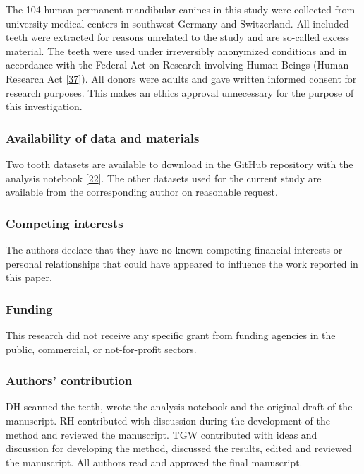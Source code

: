 \documentclass[
  american,
]{article}
\begin{document}
The 104 human permanent mandibular canines in this study were collected from university medical centers in southwest Germany and Switzerland.
All included teeth were extracted for reasons unrelated to the study and are so-called excess material.
The teeth were used under irreversibly anonymized conditions and in accordance with the Federal Act on Research involving Human Beings (Human Research Act {[}\protect\hyperlink{ref-10OKzEtEb}{37}{]}).
All donors were adults and gave written informed consent for research purposes.
This makes an ethics approval unnecessary for the purpose of this investigation.

\hypertarget{availability-of-data-and-materials}{%
\subsubsection{Availability of data and materials}\label{availability-of-data-and-materials}}

Two tooth datasets are available to download in the GitHub repository with the analysis notebook {[}\protect\hyperlink{ref-tZRGGuMm}{22}{]}.
The other datasets used for the current study are available from the corresponding author on reasonable request.

\hypertarget{competing-interests}{%
\subsubsection{Competing interests}\label{competing-interests}}

The authors declare that they have no known competing financial interests or personal relationships that could have appeared to influence the work reported in this paper.

\hypertarget{funding}{%
\subsubsection{Funding}\label{funding}}

This research did not receive any specific grant from funding agencies in the public, commercial, or not-for-profit sectors.

\hypertarget{authors-contribution}{%
\subsubsection{Authors' contribution}\label{authors-contribution}}

DH scanned the teeth, wrote the analysis notebook and the original draft of the manuscript.
RH contributed with discussion during the development of the method and reviewed the manuscript.
TGW contributed with ideas and discussion for developing the method, discussed the results, edited and reviewed the manuscript.
All authors read and approved the final manuscript.
\end{document}

